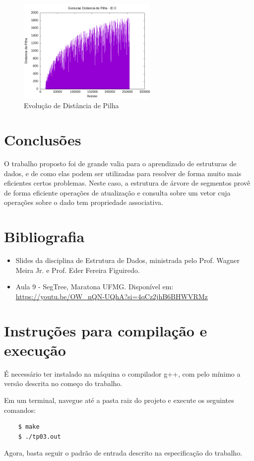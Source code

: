 \documentclass{article}
\begin{document}
\begin{figure}[H]
    \centering
    \includegraphics[width=0.6\textwidth]{./images/registro-distp-0.png}
    \caption{Evolução de Distância de Pilha}
    \label{fig:ac03}
\end{figure}



\section{Conclusões}

O trabalho proposto foi de grande valia para o aprendizado de estruturas de dados, e de como elas podem ser utilizadas para resolver de forma muito mais eficientes certos problemas. Neste caso, a estrutura de árvore de segmentos provê de forma eficiente operações de atualização e consulta sobre um vetor cuja operações sobre o dado tem propriedade associativa.

\section*{Bibliografia}

\begin{itemize}
    \item Slides da disciplina de Estrutura de Dados, ministrada pelo Prof. Wagner Meira Jr. e Prof. Eder Fereira Figuiredo.
    \item Aula 9 - SegTree, Maratona UFMG. 
    \subitem Disponível em: \url{https://youtu.be/OW_nQN-UQhA?si=4qCz2jhB6BHWVRMz}
    
\end{itemize}


\section*{Instruções para compilação e execução}

É necessário ter instalado na máquina o compilador g++, com pelo mínimo a versão descrita no começo do trabalho.  

Em um terminal, navegue até a pasta raiz do projeto e execute os seguintes comandos:

\begin{verbatim}
    $ make
    $ ./tp03.out

\end{verbatim}

Agora, basta seguir o padrão de entrada descrito na especificação do trabalho.
\end{document}
